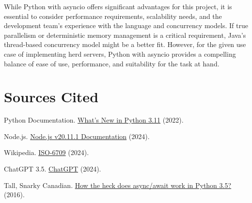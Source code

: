 While Python with asyncio offers significant advantages for this project, it is essential to consider performance requirements, scalability needs, and the development team's experience with the language and concurrency models. If true parallelism or deterministic memory management is a critical requirement, Java's thread-based concurrency model might be a better fit. However, for the given use case of implementing herd servers, Python with asyncio provides a compelling balance of ease of use, performance, and suitability for the task at hand.

\section{Sources Cited}

    Python Documentation. \href{https://docs.python.org/3/whatsnew/3.11.html#asyncio}{What's New in Python 3.11} (2022).
    
    Node.js. \href{https://nodejs.org/dist/latest-v20.x/docs/api/}{Node.js v20.11.1 Documentation} (2024).
    
    Wikipedia. \href{en.wikipedia.org/wiki/ISO_6709}{ISO-6709} (2024).
    
    ChatGPT 3.5. \href{https://chat.openai.com}{ChatGPT} (2024).

    Tall, Snarky Canadian. \href{https://snarky.ca/how-the-heck-does-async-await-work-in-python-3-5/}{How the heck does async/await work in Python 3.5?} (2016).


